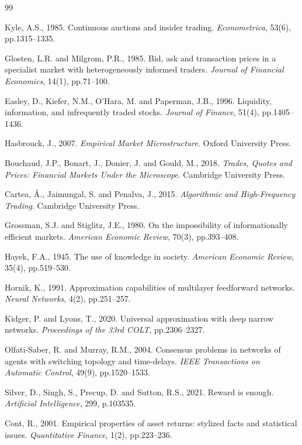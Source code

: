 \documentclass[12pt,a4paper]{article}
\theoremstyle{definition}
\begin{document}
\begin{thebibliography}{99}

 Kyle, A.S., 1985. Continuous auctions and insider trading. \textit{Econometrica}, 53(6), pp.1315--1335.

 Glosten, L.R. and Milgrom, P.R., 1985. Bid, ask and transaction prices in a specialist market with heterogeneously informed traders. \textit{Journal of Financial Economics}, 14(1), pp.71--100.

 Easley, D., Kiefer, N.M., O'Hara, M. and Paperman, J.B., 1996. Liquidity, information, and infrequently traded stocks. \textit{Journal of Finance}, 51(4), pp.1405--1436.

 Hasbrouck, J., 2007. \textit{Empirical Market Microstructure}. Oxford University Press.

 Bouchaud, J.P., Bonart, J., Donier, J. and Gould, M., 2018. \textit{Trades, Quotes and Prices: Financial Markets Under the Microscope}. Cambridge University Press.

 Cartea, \'A., Jaimungal, S. and Penalva, J., 2015. \textit{Algorithmic and High-Frequency Trading}. Cambridge University Press.

 Grossman, S.J. and Stiglitz, J.E., 1980. On the impossibility of informationally efficient markets. \textit{American Economic Review}, 70(3), pp.393--408.

 Hayek, F.A., 1945. The use of knowledge in society. \textit{American Economic Review}, 35(4), pp.519--530.

 Hornik, K., 1991. Approximation capabilities of multilayer feedforward networks. \textit{Neural Networks}, 4(2), pp.251--257.

 Kidger, P. and Lyons, T., 2020. Universal approximation with deep narrow networks. \textit{Proceedings of the 33rd COLT}, pp.2306--2327.

 Olfati-Saber, R. and Murray, R.M., 2004. Consensus problems in networks of agents with switching topology and time-delays. \textit{IEEE Transactions on Automatic Control}, 49(9), pp.1520--1533.

 Silver, D., Singh, S., Precup, D. and Sutton, R.S., 2021. Reward is enough. \textit{Artificial Intelligence}, 299, p.103535.

 Cont, R., 2001. Empirical properties of asset returns: stylized facts and statistical issues. \textit{Quantitative Finance}, 1(2), pp.223--236.


\end{thebibliography}
\end{document}
